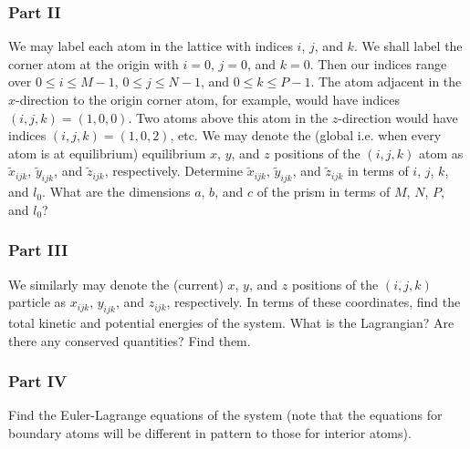 \documentclass[letterpaper,12pt]{article}
\begin{document}
\begin{flushleft}
    \subsubsection*{Part II}
    We may label each atom in the lattice with indices $i$, $j$, and $k$. We shall label the corner atom at the origin with $i = 0$, $j = 0$, and $k = 0$. Then our indices range over $0 \leq i \leq M-1$, $0 \leq j \leq N-1$, and $0 \leq k \leq P-1$. The atom adjacent in the $x$-direction to the origin corner atom, for example, would have indices $(i, j, k) = (1, 0, 0)$. Two atoms above this atom in the $z$-direction would have indices $(i, j, k) = (1, 0, 2)$, etc. We may denote the (global i.e. when every atom is at equilibrium) equilibrium $x$, $y$, and $z$ positions of the $(i, j, k)$ atom as $\tilde{x}_{ijk}$, $\tilde{y}_{ijk}$, and $\tilde{z}_{ijk}$, respectively. \newline\newline
    Determine $\tilde{x}_{ijk}$, $\tilde{y}_{ijk}$, and $\tilde{z}_{ijk}$ in terms of $i$, $j$, $k$, and $l_0$. What are the dimensions $a$, $b$, and $c$ of the prism in terms of $M$, $N$, $P$, and $l_0$?

    \subsubsection*{Part III}
    We similarly may denote the (current) $x$, $y$, and $z$ positions of the $(i, j, k)$ particle as $x_{ijk}$, $y_{ijk}$, and $z_{ijk}$, respectively. In terms of these coordinates, find the total kinetic and potential energies of the system. What is the Lagrangian? Are there any conserved quantities? Find them.

    \subsubsection*{Part IV}
    Find the Euler-Lagrange equations of the system (note that the equations for boundary atoms will be different in pattern to those for interior atoms).


\end{flushleft}
\end{document}
